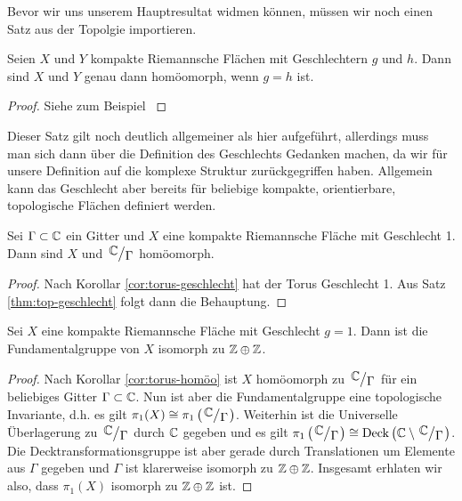 Bevor wir uns unserem Hauptresultat widmen können, müssen wir noch
einen Satz aus der Topolgie importieren.

\begin{thm}
  \label{thm:top-geschlecht}
  Seien $X$ und $Y$ kompakte Riemannsche Flächen mit Geschlechtern $g$
  und $h$. Dann sind $X$ und $Y$ genau dann homöomorph, wenn $g = h$ ist.
\end{thm}

\begin{proof}
  Siehe zum Beispiel \cite[Korollar 2.4.A.2]{Jos}
\end{proof}

\begin{rem}
  Dieser Satz gilt noch deutlich allgemeiner als hier aufgeführt,
  allerdings muss man sich dann über die Definition des Geschlechts
  Gedanken machen, da wir für unsere Definition auf die
  komplexe Struktur zurückgegriffen haben. Allgemein kann das
  Geschlecht aber bereits für beliebige kompakte, orientierbare, topologische
  Flächen definiert werden.
\end{rem}

\begin{cor}
  \label{cor:torus-homöo}
  Sei $\Gamma \subset \mathbb{C}$ ein Gitter und $X$ eine kompakte Riemannsche
  Fläche mit Geschlecht 1. Dann sind $X$ und $\quot{\C}{\Gamma}$ homöomorph.
\end{cor}

\begin{proof}
  Nach Korollar \ref{cor:torus-geschlecht} hat der Torus Geschlecht
  1. Aus Satz \ref{thm:top-geschlecht} folgt dann die Behauptung.
\end{proof}

\begin{thm}
  \label{thm:geschlecht-1-z}
  Sei $X$ eine kompakte Riemannsche Fläche mit Geschlecht $g =
  1$. Dann ist die Fundamentalgruppe von $X$ isomorph zu $\mathbb{Z} \oplus \mathbb{Z}$.
\end{thm}

\begin{proof}
  Nach Korollar \ref{cor:torus-homöo} ist $X$ homöomorph zu
  $\quot{\C}{\Gamma}$ für ein beliebiges Gitter $\Gamma \subset
  \mathbb{C}$. Nun ist aber die Fundamentalgruppe eine topologische
  Invariante, d.h. es gilt \break$\pi_1(X) \cong
  \pi_1\left(\quot{\C}{\Gamma}\right)$. Weiterhin ist die Universelle
  Überlagerung zu $\quot{\C}{\Gamma}$ durch $\mathbb{C}$ gegeben und es gilt $
  \pi_1\left (\quot{\C}{\Gamma}\right) \cong \Deck \left (\C \setminus
    \quot{\C}{\Gamma} \right )$. Die Decktransformationsgruppe ist
  aber gerade durch Translationen um Elemente aus $\Gamma$ gegeben und
  $\Gamma$ ist klarerweise isomorph zu $\mathbb{Z} \oplus \mathbb{Z}$. Insgesamt
  erhlaten wir also, dass $\pi_1(X)$ isomorph zu $\mathbb{Z} \oplus \mathbb{Z}$ ist.
\end{proof}

